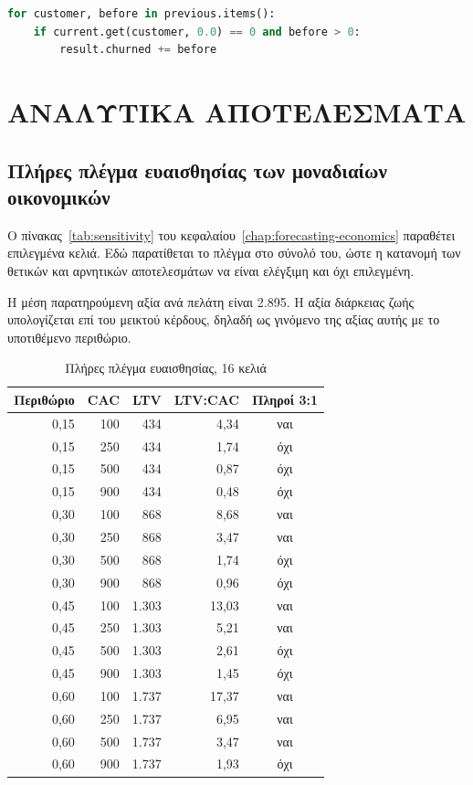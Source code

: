 \begin{appendix}
\begin{lstlisting}[language=Python,caption={Κατάταξη των εσόδων σε έξι ροές},label={lst:flows}]
for customer, before in previous.items():
    if current.get(customer, 0.0) == 0 and before > 0:
        result.churned += before
\end{lstlisting}

\chapter{ΑΝΑΛΥΤΙΚΑ ΑΠΟΤΕΛΕΣΜΑΤΑ}
\label{app:results}

\section{Πλήρες πλέγμα ευαισθησίας των μοναδιαίων οικονομικών}

Ο πίνακας~\ref{tab:sensitivity} του κεφαλαίου~\ref{chap:forecasting-economics}
παραθέτει επιλεγμένα κελιά. Εδώ παρατίθεται το πλέγμα στο σύνολό του, ώστε η
κατανομή των θετικών και αρνητικών αποτελεσμάτων να είναι ελέγξιμη και όχι
επιλεγμένη.

Η μέση παρατηρούμενη αξία ανά πελάτη είναι 2.895. Η αξία διάρκειας ζωής
υπολογίζεται επί του μεικτού κέρδους, δηλαδή ως γινόμενο της αξίας αυτής με το
υποτιθέμενο περιθώριο.

\begin{table}[H]
\centering
\caption{Πλήρες πλέγμα ευαισθησίας, 16 κελιά}
\label{tab:sensitivity-full}
\begin{tabular}{rrrrc}
\toprule
Περιθώριο & CAC & LTV & LTV:CAC & Πληροί 3:1 \\
\midrule
0,15 & 100 &   434 & 4,34 & ναι \\
0,15 & 250 &   434 & 1,74 & όχι \\
0,15 & 500 &   434 & 0,87 & όχι \\
0,15 & 900 &   434 & 0,48 & όχι \\
\midrule
0,30 & 100 &   868 & 8,68 & ναι \\
0,30 & 250 &   868 & 3,47 & ναι \\
0,30 & 500 &   868 & 1,74 & όχι \\
0,30 & 900 &   868 & 0,96 & όχι \\
\midrule
0,45 & 100 & 1.303 & 13,03 & ναι \\
0,45 & 250 & 1.303 &  5,21 & ναι \\
0,45 & 500 & 1.303 &  2,61 & όχι \\
0,45 & 900 & 1.303 &  1,45 & όχι \\
\midrule
0,60 & 100 & 1.737 & 17,37 & ναι \\
0,60 & 250 & 1.737 &  6,95 & ναι \\
0,60 & 500 & 1.737 &  3,47 & ναι \\
0,60 & 900 & 1.737 &  1,93 & όχι \\
\bottomrule
\end{tabular}
\end{table}


\end{appendix}

